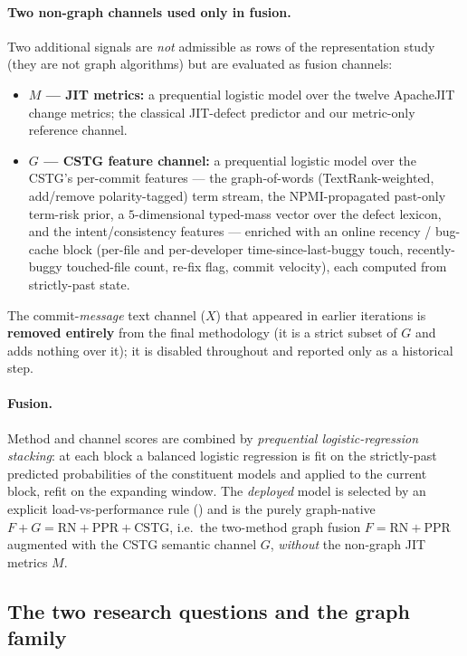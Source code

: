 	\paragraph{Two non-graph channels used only in fusion.} Two additional signals are
	\emph{not} admissible as rows of the representation study (they are not graph
	algorithms) but are evaluated as fusion channels:
	\begin{itemize}
		\item \textbf{$M$ --- JIT metrics:} a prequential logistic model over the twelve
		ApacheJIT change metrics; the classical JIT-defect predictor and our metric-only
		reference channel.
		\item \textbf{$G$ --- CSTG feature channel:} a prequential logistic model over the
		CSTG's per-commit features --- the graph-of-words (TextRank-weighted, add/remove
		polarity-tagged) term stream, the NPMI-propagated past-only term-risk prior, a
		$5$-dimensional typed-mass vector over the defect lexicon, and the intent/consistency
		features --- enriched with an online recency / bug-cache block (per-file and
		per-developer time-since-last-buggy touch, recently-buggy touched-file count, re-fix
		flag, commit velocity), each computed from strictly-past state.
	\end{itemize}
	The commit-\emph{message} text channel ($X$) that appeared in earlier iterations is
	\textbf{removed entirely} from the final methodology (it is a strict subset of $G$ and
	adds nothing over it); it is disabled throughout and reported only as a historical
	step.
	
	\paragraph{Fusion.} Method and channel scores are combined by \emph{prequential
		logistic-regression stacking}: at each block a balanced logistic regression is fit on
	the strictly-past predicted probabilities of the constituent models and applied to the
	current block, refit on the expanding window. The \emph{deployed} model is selected by
	an explicit load-vs-performance rule () and is the
	purely graph-native \textbf{$F{+}G = \text{RN}{+}\text{PPR}{+}\text{CSTG}$}, i.e.\ the
	two-method graph fusion $F=\text{RN}{+}\text{PPR}$ augmented with the CSTG semantic
	channel $G$, \emph{without} the non-graph JIT metrics $M$.
	
	\subsection{The two research questions and the graph family}
	\label{sec:setup-rqs}
	
